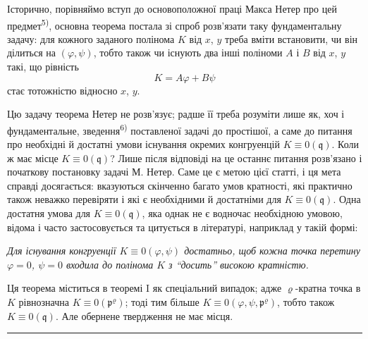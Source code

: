 \documentclass[11pt]{article}
\theoremstyle{plain}
\begin{document}
Історично, порівняймо вступ до основоположної праці Макса Нетер
про цей предмет\textsuperscript{5)}, основна теорема постала зі
спроб розв'язати таку фундаментальну задачу: для кожного заданого
полінома $K$ від $x$, $y$ треба вміти встановити, чи він ділиться
на $(\varphi, \psi)$, тобто також чи існують два інші поліноми
$A$ і $B$ від $x$, $y$ такі, що рівність
\[
K = A\varphi + B\psi
\]
стає тотожністю відносно $x$, $y$.

Цю задачу теорема Нетер не розв'язує; радше її треба розуміти лише
як, хоч і фундаментальне, зведення\textsuperscript{6)} поставленої
задачі до простішої, а саме до питання про необхідні й достатні
умови існування окремих конгруенцій $K \equiv 0(\mathfrak{q})$.
Коли ж має місце $K \equiv 0(\mathfrak{q})$? Лише після відповіді
на це останнє питання розв'язано і початкову постановку задачі
М. Нетер. Саме це є метою цієї статті, і ця мета справді
досягається: вказуються скінченно багато умов кратності, які
практично також неважко перевіряти і які є необхідними й
достатніми для $K \equiv 0(\mathfrak{q})$. Одна достатня умова для
$K \equiv 0(\mathfrak{q})$, яка однак не є водночас необхідною
умовою, відома і часто застосовується та цитується в літературі,
наприклад у такій формі:

\smallskip
\textit{Для існування конгруенції $K \equiv 0(\varphi, \psi)$
достатньо, щоб кожна точка перетину $\varphi = 0$, $\psi = 0$
входила до полінома $K$ з ``досить'' високою кратністю.}

\smallskip
Ця теорема міститься в теоремі I як спеціальний випадок; адже
$\varrho$-кратна точка в $K$ рівнозначна $K \equiv 0(\mathfrak{p}^{\varrho})$;
тоді тим більше $K \equiv 0(\varphi, \psi, \mathfrak{p}^{\varrho})$,
тобто також $K \equiv 0(\mathfrak{q})$. Але обернене твердження не
має місця.

\vspace{0.5em}
\noindent\rule{\textwidth}{0.4pt}
\vspace{0.3em}
\end{document}
